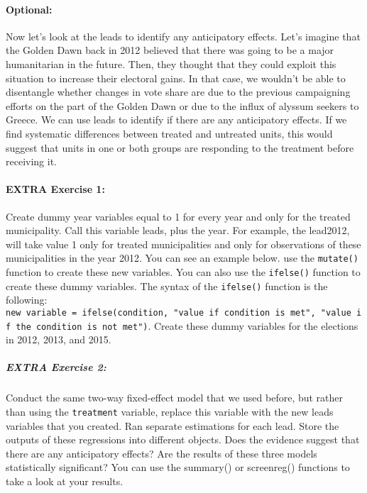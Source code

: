 \documentclass[
]{article}
\begin{document}
\paragraph{Optional:}\label{optional}

Now let's look at the leads to identify any anticipatory effects. Let's
imagine that the Golden Dawn back in 2012 believed that there was going
to be a major humanitarian in the future. Then, they thought that they
could exploit this situation to increase their electoral gains. In that
case, we wouldn't be able to disentangle whether changes in vote share
are due to the previous campaigning efforts on the part of the Golden
Dawn or due to the influx of alyssum seekers to Greece. We can use leads
to identify if there are any anticipatory effects. If we find systematic
differences between treated and untreated units, this would suggest that
units in one or both groups are responding to the treatment before
receiving it.

\paragraph{EXTRA Exercise 1:}\label{extra-exercise-1}

Create dummy year variables equal to 1 for every year and only for the
treated municipality. Call this variable leads, plus the year. For
example, the lead2012, will take value 1 only for treated municipalities
and only for observations of these municipalities in the year 2012. You
can see an example below. use the \texttt{mutate()} function to create
these new variables. You can also use the \texttt{ifelse()} function to
create these dummy variables. The syntax of the \texttt{ifelse()}
function is the following:
\texttt{new\ variable\ =\ ifelse(condition,\ "value\ if\ condition\ is\ met",\ "value\ if\ the\ condition\ is\ not\ met")}.
Create these dummy variables for the elections in 2012, 2013, and 2015.

\subparagraph{EXTRA Exercise 2:}\label{extra-exercise-2}

Conduct the same two-way fixed-effect model that we used before, but
rather than using the \texttt{treatment} variable, replace this variable
with the new leads variables that you created. Ran separate estimations
for each lead. Store the outputs of these regressions into different
objects. Does the evidence suggest that there are any anticipatory
effects? Are the results of these three models statistically
significant? You can use the summary() or screenreg() functions to take
a look at your results.
\end{document}
